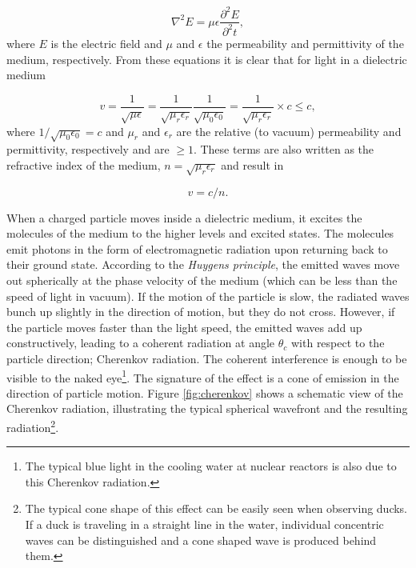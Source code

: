 \begin{equation}
\nabla^2E = \mu \epsilon \frac{\partial^2 E}{\partial^2 t},
\end{equation}
where $E$ is the electric field and $\mu$ and $\epsilon$ the permeability and permittivity of the medium, respectively. From these equations it is clear that for light in a dielectric medium

\begin{equation}
v = \frac{1}{\sqrt{\mu \epsilon}} = \frac{1}{\sqrt{\mu_r \epsilon_r}}\frac{1}{\sqrt{\mu_0 \epsilon_0}} = \frac{1}{\sqrt{\mu_r \epsilon_r}} \times c \leq c,
\end{equation}
where $1/\sqrt{\mu_0 \epsilon_0} = c$ and $\mu_r$ and $\epsilon_r$ are the relative (to vacuum) permeability and permittivity, respectively and are $\geq 1$. These terms are also written as the refractive index of the medium, $n = \sqrt{\mu_r \epsilon_r}$ and result in

\begin{equation}
v = c/n.
\end{equation}

\noindent When a charged particle moves inside a dielectric medium, it excites the molecules of the medium to the higher levels and excited states. The molecules emit photons in the form of electromagnetic radiation upon returning back to their ground state. According to the \textit{Huygens principle}, the emitted waves move out spherically at the phase velocity of the medium (which can be less than the speed of light in vacuum). If the motion of the particle is slow, the radiated waves bunch up slightly in the direction of motion, but they do not cross. However, if the particle moves faster than the light speed, the emitted waves add up constructively, leading to a coherent radiation at angle $\theta_c$ with respect to the particle direction; Cherenkov radiation. The coherent interference is enough to be visible to the naked eye\footnote{The typical blue light in the cooling water at nuclear reactors is also due to this Cherenkov radiation.}. The signature of the effect is a cone of emission in the direction of particle motion. Figure \ref{fig:cherenkov} shows a schematic view of the Cherenkov radiation, illustrating the typical spherical wavefront and the resulting radiation\footnote{The typical cone shape of this effect can be easily seen when observing ducks. If a duck is traveling in a straight line in the water, individual concentric waves can be distinguished and a cone shaped wave is produced behind them.}.


